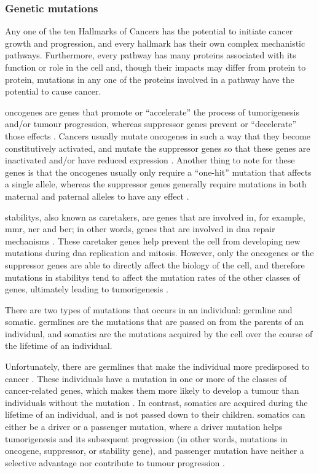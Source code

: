 \subsubsection{Genetic mutations}
\label{ssub:Genetic mutations}

Any one of the ten Hallmarks of Cancers has the potential to initiate cancer growth and progression, and every hallmark has their own complex mechanistic pathways.
Furthermore, every pathway has many proteins associated with its function or role in the cell and, though their impacts may differ from protein to protein, mutations in any one of the proteins involved in a pathway have the potential to cause cancer.

\Glspl{oncogene} are genes that promote or ``accelerate'' the process of tumorigenesis and/or tumour progression, whereas \gls{suppressor} genes prevent or ``decelerate'' those effects \citep{Vogelstein2004a}.
Cancers usually mutate \glspl{oncogene} in such a way that they become constitutively activated, and mutate the \gls{suppressor} genes so that these genes are inactivated and/or have reduced expression \citep{Vogelstein2004a}.
Another thing to note for these genes is that the \glspl{oncogene} usually only require a ``one-hit'' mutation that affects a single allele, whereas the \gls{suppressor} genes generally require mutations in both maternal and paternal \glspl{allele} to have any effect \citep{Stratton2009,Vogelstein2004a}.

\Glspl{stability}, also known as caretakers, are genes that are involved in, for example,  \gls{mmr}, \gls{ner} and \gls{ber}; in other words, genes that are involved in \acrshort{dna} repair mechanisms \citep{Vogelstein2004a}.
These caretaker genes help prevent the cell from developing new mutations during \acrshort{dna} replication and mitosis.
However, only the \glspl{oncogene} or the \gls{suppressor} genes are able to directly affect the biology of the cell, and therefore mutations in \glspl{stability} tend to affect the mutation rates of the other classes of genes, ultimately leading to tumorigenesis \citep{Vogelstein2004a}.

There are two types of mutations that occurs in an individual: \gls{germline} and \gls{somatic}.
\Glspl{germline} are the mutations that are passed on from the parents of an individual, and \glspl{somatic} are the mutations acquired by the cell over the course of the lifetime of an individual.

Unfortunately, there are \glspl{germline} that make the individual more predisposed to cancer \citep{Vogelstein2004a}.
These individuals have a mutation in one or more of the classes of cancer-related genes, which makes them more likely to develop a tumour than individuals without the mutation \citep{Vogelstein2004a}.
In contrast, \glspl{somatic} are acquired during the lifetime of an individual, and is not passed down to their children.
\Glspl{somatic} can either be a \gls{driver} or a \gls{passenger} mutation, where a \gls{driver} mutation helps tumorigenesis and its subsequent progression (in other words, mutations in \gls{oncogene}, \gls{suppressor}, or stability gene), and \gls{passenger} mutation have neither a selective advantage nor contribute to tumour progression \citep{Stratton2009}.

